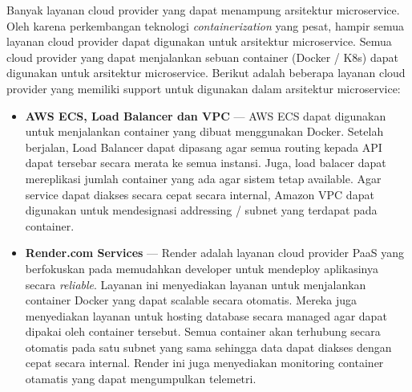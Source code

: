\documentclass[
	11pt, %
	indonesian
]{assignment}
\begin{document}
Banyak layanan cloud provider yang dapat menampung arsitektur microservice. Oleh karena perkembangan teknologi \textit{containerization} yang pesat, hampir semua layanan cloud provider dapat digunakan untuk arsitektur microservice. Semua cloud provider yang dapat menjalankan sebuan container (Docker / K8s) dapat digunakan untuk arsitektur microservice. Berikut adalah beberapa layanan cloud provider yang memiliki support untuk digunakan dalam arsitektur microservice:

\begin{itemize}
	\item \textbf{AWS ECS, Load Balancer dan VPC} --- AWS ECS dapat digunakan untuk menjalankan container yang dibuat menggunakan Docker. Setelah berjalan, Load Balancer dapat dipasang agar semua routing kepada API dapat tersebar secara merata ke semua instansi. Juga, load balacer dapat mereplikasi jumlah container yang ada agar sistem tetap available. Agar service dapat diakses secara cepat secara internal, Amazon VPC dapat digunakan untuk mendesignasi addressing / subnet yang terdapat pada container.

	\item \textbf{Render.com Services} --- Render adalah layanan cloud provider PaaS yang berfokuskan pada memudahkan developer untuk mendeploy aplikasinya secara \textit{reliable}. Layanan ini menyediakan layanan untuk menjalankan container Docker yang dapat scalable secara otomatis. Mereka juga menyediakan layanan untuk hosting database secara managed agar dapat dipakai oleh container tersebut. Semua container akan terhubung secara otomatis pada satu subnet yang sama sehingga data dapat diakses dengan cepat secara internal. Render ini juga menyediakan monitoring container otamatis yang dapat mengumpulkan telemetri.
\end{itemize}
\end{document}
